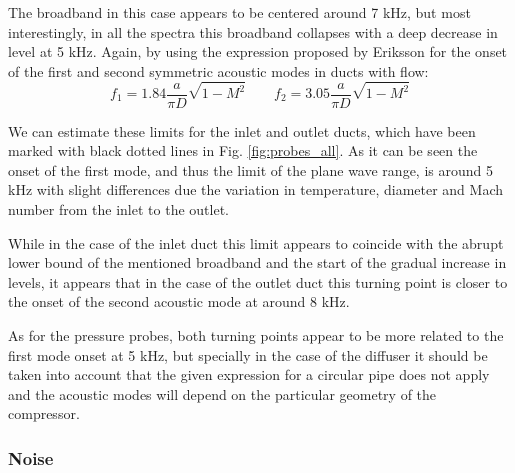 The broadband in this case appears to be centered around 7 kHz, but most interestingly, in all the spectra this broadband collapses with a deep decrease in level at 5 kHz. Again, by using the expression proposed by Eriksson \cite{eriksson1980higher} for the onset of the first and second symmetric acoustic modes in ducts with flow:
\begin{equation}
  f_{1} = 1.84 \frac{a}{\pi D}\sqrt{1-M^2}\qquad f_{2} = 3.05 \frac{a}{\pi D}\sqrt{1-M^2}
\end{equation}

We can estimate these limits for the inlet and outlet ducts, which have been marked with black dotted lines in Fig. \ref{fig:probes_all}. As it can be seen the onset of the first mode, and thus the limit of the plane wave range, is around 5 kHz with slight differences due the variation in temperature, diameter and Mach number from the inlet to the outlet.

While in the case of the inlet duct this limit appears to coincide with the abrupt lower bound of the mentioned broadband and the start of the gradual increase in levels, it appears that in the case of the outlet duct this turning point is closer to the onset of the second acoustic mode at around 8 kHz. 

As for the pressure probes, both turning points appear to be more related to the first mode onset at 5 kHz, but specially in the case of the diffuser it should be taken into account that the given expression for a circular pipe does not apply and the acoustic modes will depend on the particular geometry of the compressor.

\subsubsection{Noise}



